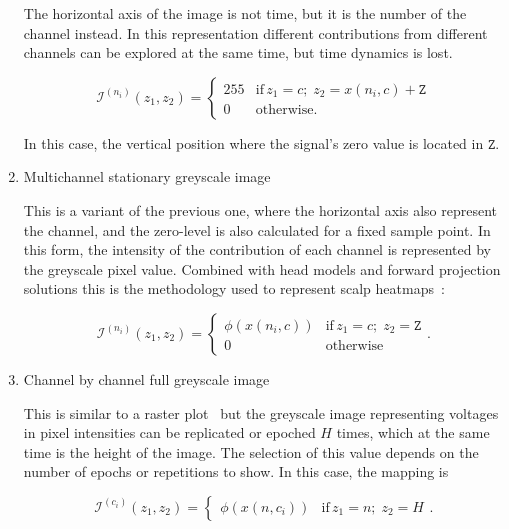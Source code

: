 \begin{enumerate}
The horizontal axis of the image is not time, but it is the number of the channel instead.   In this representation different contributions from different channels can be explored at the same time, but time dynamics is lost.  

\begin{equation}
\mathcal{I}^{(n_i)}(z_1,z_2) = \left\{ \begin{array}{rl}
255 & \text{if} \,  z_1 = c; \; z_2 =  x(n_i,c) + \mathtt{Z} \\
0   & \mbox{otherwise}.
\end{array}\right.
\label{eq:image4}
\end{equation}

In this case, the vertical position where the signal's zero value is located in $\mathtt{Z}$.

\item Multichannel stationary greyscale image

This is a variant of the previous one, where the horizontal axis also represent the channel, and the zero-level is also calculated for a fixed sample point.   In this form, the intensity of the contribution of each channel is represented by the greyscale pixel value.  Combined with head models and forward projection solutions this is the methodology used to represent scalp heatmaps~\cite{Gramfort2013}:

\begin{equation}
\mathcal{I}^{(n_i)}(z_1,z_2)= \left\{ \begin{array}{rl}
\phi(x(n_i,c)) & \text{if} \,  z_1 = c; \; z_2 =  \mathtt{Z} \\
0   & \mbox{otherwise}
\end{array}\right ..
\label{eq:image5}
\end{equation}


\item Channel by channel full greyscale image

This is similar to a raster plot~\cite{Cohen2014} but the greyscale image representing voltages in pixel intensities can be replicated or epoched $H$ times, which at the same time is the height of the image.  The selection of this value depends on the number of epochs or repetitions to show.  In this case, the mapping is

\begin{equation}
\mathcal{I}^{(c_i)}(z_1,z_2) = \left\{ \begin{array}{rl} \phi(x(n,c_i))  & \text{if} \,  z_1 = n; \; z_2 = H \end{array}\right. .
\label{eq:image6}
\end{equation}


\end{enumerate}


